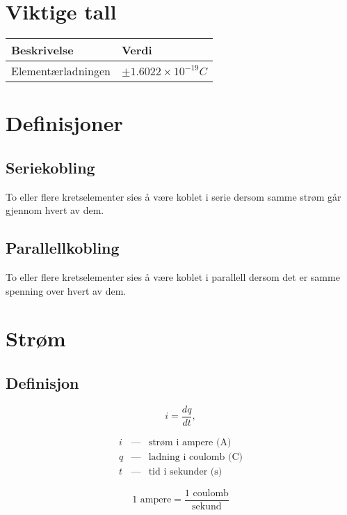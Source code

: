 \documentclass[norsk, a4paper, 12pt, twoside, titlepage]{article}
\begin{document}
\newpage
\section{Viktige tall}
\begin{tabular}{|p{8.5cm}|p{5cm}|}
\hline
Beskrivelse & Verdi \\
\hline
Elementærladningen & $\pm 1.6022 \times 10^{-19} C$ \\
\hline
\end{tabular}


\newpage
\section{Definisjoner}
\subsection{Seriekobling}
To eller flere kretselementer sies å være koblet i serie dersom samme
strøm går gjennom hvert av dem.

\subsection{Parallellkobling}
To eller flere kretselementer sies å være koblet i parallell dersom
det er samme spenning over hvert av dem.


\newpage
\section{Strøm}
\subsection{Definisjon}
\begin{equation}
i = \frac{dq}{dt},
\end{equation}

\begin{eqnarray*}
i & \mbox{---} & \mbox{strøm i ampere (A)} \\
q & \mbox{---} & \mbox{ladning i coulomb (C)} \\
t & \mbox{---} & \mbox{tid i sekunder (s)}
\end{eqnarray*}

\bigskip

\begin{equation}
1 \mbox{ ampere} = \frac{\mbox{1 coulomb}}{\mbox{sekund}}
\end{equation}
\end{document}
